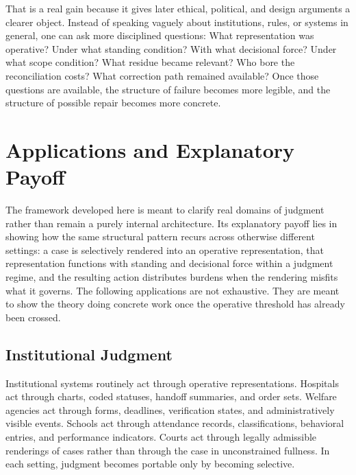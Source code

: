 \documentclass[11pt]{article}
\begin{document}
That is a real gain because it gives later ethical, political, and design arguments a clearer object. Instead of speaking vaguely about institutions, rules, or systems in general, one can ask more disciplined questions: What representation was operative? Under what standing condition? With what decisional force? Under what scope condition? What residue became relevant? Who bore the reconciliation costs? What correction path remained available? Once those questions are available, the structure of failure becomes more legible, and the structure of possible repair becomes more concrete.

\section{Applications and Explanatory Payoff}

The framework developed here is meant to clarify real domains of judgment rather than remain a purely internal architecture. Its explanatory payoff lies in showing how the same structural pattern recurs across otherwise different settings: a case is selectively rendered into an operative representation, that representation functions with standing and decisional force within a judgment regime, and the resulting action distributes burdens when the rendering misfits what it governs. The following applications are not exhaustive. They are meant to show the theory doing concrete work once the operative threshold has already been crossed.

\subsection{Institutional Judgment}

Institutional systems routinely act through operative representations. Hospitals act through charts, coded statuses, handoff summaries, and order sets. Welfare agencies act through forms, deadlines, verification states, and administratively visible events. Schools act through attendance records, classifications, behavioral entries, and performance indicators. Courts act through legally admissible renderings of cases rather than through the case in unconstrained fullness. In each setting, judgment becomes portable only by becoming selective.
\end{document}
